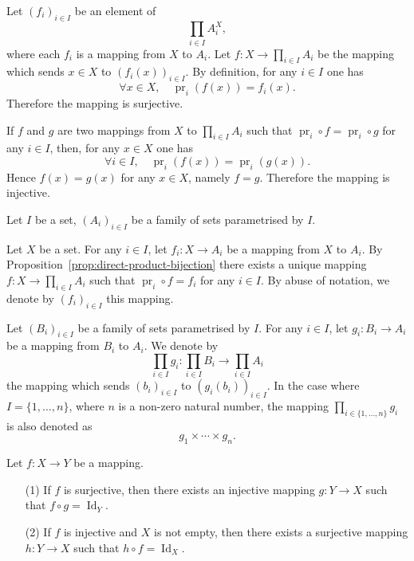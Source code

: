 \documentclass{book}
\begin{document}
\begin{proofenv}
Let $(f_i)_{i \in I}$ be an element of
\[
\prod_{i \in I} A_i^X,
\]
where each $f_i$ is a mapping from $X$ to $A_i$. Let $f : X \to \prod_{i \in I} A_i$ be the mapping which sends $x \in X$ to $(f_i(x))_{i \in I}$. By definition, for any $i \in I$ one has
\[
\forall x \in X, \quad \operatorname{pr}_i(f(x)) = f_i(x).
\]
Therefore the mapping is surjective.

If $f$ and $g$ are two mappings from $X$ to $\prod_{i \in I} A_i$ such that $\operatorname{pr}_i \circ f = \operatorname{pr}_i \circ g$ for any $i \in I$, then, for any $x \in X$ one has
\[
\forall i \in I, \quad \operatorname{pr}_i(f(x)) = \operatorname{pr}_i(g(x)).
\]
Hence $f(x) = g(x)$ for any $x \in X$, namely $f = g$. Therefore the mapping is injective.
\end{proofenv}

\begin{notationenv}
\label{not:direct-product-mappings}
Let $I$ be a set, $(A_i)_{i \in I}$ be a family of sets parametrised by $I$.

Let $X$ be a set. For any $i \in I$, let $f_i : X \to A_i$ be a mapping from $X$ to $A_i$. By Proposition~\ref{prop:direct-product-bijection} there exists a unique mapping $f : X \to \prod_{i \in I} A_i$ such that $\operatorname{pr}_i \circ f = f_i$ for any $i \in I$. By abuse of notation, we denote by $(f_i)_{i \in I}$ this mapping.

Let $(B_i)_{i \in I}$ be a family of sets parametrised by $I$. For any $i \in I$, let $g_i : B_i \to A_i$ be a mapping from $B_i$ to $A_i$. We denote by
\[
\prod_{i \in I} g_i : \prod_{i \in I} B_i \longrightarrow \prod_{i \in I} A_i
\]
the mapping which sends $(b_i)_{i \in I}$ to $(g_i(b_i))_{i \in I}$. In the case where $I = \{1, \ldots, n\}$, where $n$ is a non-zero natural number, the mapping $\prod_{i \in \{1, \ldots, n\}} g_i$ is also denoted as
\[
g_1 \times \cdots \times g_n.
\]
\end{notationenv}

\begin{propositionenv}
\label{prop:direct-product-factorization}
Let $f : X \to Y$ be a mapping.
\begin{enumerate}
    \item[(1)] If $f$ is surjective, then there exists an injective mapping $g : Y \to X$ such that $f \circ g = \operatorname{Id}_Y$.
    \item[(2)] If $f$ is injective and $X$ is not empty, then there exists a surjective mapping $h : Y \to X$ such that $h \circ f = \operatorname{Id}_X$.
\end{enumerate}
\end{propositionenv}
\end{document}
